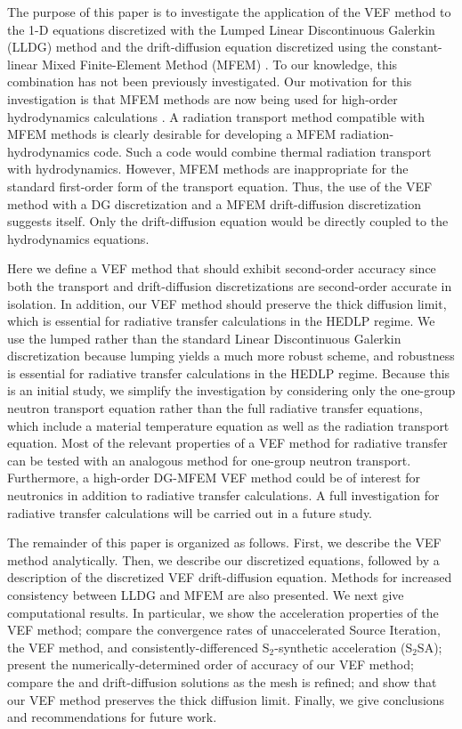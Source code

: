 The purpose of this paper is to investigate the application of the VEF method to the 1-D \SN equations 
discretized with the Lumped Linear Discontinuous Galerkin (LLDG) method and the drift-diffusion equation discretized using the 
constant-linear Mixed Finite-Element Method (MFEM) \cite{Raviart1977}.  To our knowledge, this combination has not been previously 
investigated. Our motivation for this investigation is that MFEM methods are now being used for high-order hydrodynamics 
calculations \cite{blast}.  A radiation transport method compatible with MFEM 
methods is clearly desirable for developing a MFEM radiation-hydrodynamics code.  Such a code would combine thermal 
radiation transport with hydrodynamics.  However, MFEM methods are inappropriate for the standard first-order form of the 
transport equation.  Thus, the use of the VEF method with a DG \SN discretization and a MFEM drift-diffusion discretization 
suggests itself.  Only the drift-diffusion equation would be directly coupled to the hydrodynamics equations.

Here we define a VEF method that should exhibit second-order accuracy since both the transport and drift-diffusion 
discretizations are second-order accurate in isolation.  In addition, our VEF method should preserve the thick diffusion 
limit, which is essential for radiative transfer calculations in the HEDLP regime. We use the lumped 
rather than the standard Linear Discontinuous Galerkin discretization because lumping yields a much more robust scheme, and 
robustness is essential 
for radiative transfer calculations in the HEDLP regime.   Because this is an initial study, we simplify the investigation 
by considering only the one-group neutron transport equation rather than the full radiative transfer equations, which include a 
material temperature equation as well as the radiation transport equation.  Most of the relevant properties of  
a VEF method for radiative transfer can be tested with an analogous method for one-group neutron transport.  Furthermore, 
a high-order DG-MFEM VEF method could be of interest for neutronics in addition to radiative transfer calculations. 
A full investigation for radiative transfer calculations will be carried out in a future study. 

The remainder of this paper is organized as follows.  First, we describe the VEF method analytically. Then, we describe 
our discretized \SN equations, followed by a description of the discretized VEF drift-diffusion equation. Methods for increased 
consistency between LLDG and MFEM are also presented. We next give computational results.  In particular, we show the acceleration properties of the VEF method; compare the convergence rates of unaccelerated Source Iteration, the VEF method, and consistently-differenced S$_2$-synthetic acceleration (S$_2$SA); present the numerically-determined order of accuracy of our VEF method; compare the \SN and drift-diffusion solutions as the mesh is refined; and show that our VEF method preserves the thick diffusion limit. Finally, we give conclusions and recommendations for future work. 

